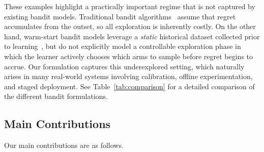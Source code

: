 \documentclass[twoside,11pt]{article}
\begin{document}
These examples highlight a practically important regime that is not captured by existing bandit models. Traditional bandit algorithms~\citep{auer2002finite,agrawal2017near,lattimore2020bandit} assume that regret accumulates from the outset, so all exploration is inherently costly. On the other hand, warm-start bandit models leverage a \textit{static} historical dataset collected prior to learning~\citep{shivaswamy2012multi,cheung2024leveraging,flore2025balancing}, but do not explicitly model a controllable exploration phase in which the learner actively chooses which arms to sample before regret begins to accrue. Our formulation captures this underexplored setting, which naturally arises in many real-world systems involving calibration, offline experimentation, and staged deployment. See Table~\ref{tab:comparison} for a detailed comparison of the different bandit formulations.

\subsection{Main Contributions} 
Our main contributions are as follows.
\end{document}
